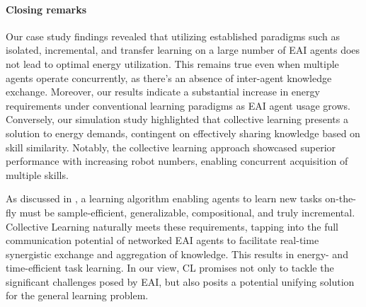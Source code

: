 \documentclass[12pt]{article}
\begin{document}
\paragraph*{Closing remarks}
Our case study findings revealed that utilizing established paradigms such as isolated, incremental, and transfer learning on a large number of EAI agents does not lead to optimal energy utilization. This remains true even when multiple agents operate concurrently, as there's an absence of inter-agent knowledge exchange. Moreover, our results indicate a substantial increase in energy requirements under conventional learning paradigms as EAI agent usage grows. Conversely, our simulation study highlighted that collective learning presents a solution to energy demands, contingent on effectively sharing knowledge based on skill similarity. Notably, the collective learning approach showcased superior performance with increasing robot numbers, enabling concurrent acquisition of multiple skills.

As discussed in \cite{Kaelbling2020foundationefficientrobot}, a learning algorithm enabling agents to learn new tasks on-the-fly must be sample-efficient, generalizable, compositional, and truly incremental. Collective Learning naturally meets these requirements, tapping into the full communication potential of networked EAI agents to facilitate real-time synergistic exchange and aggregation of knowledge. This results in energy- and time-efficient task learning. In our view, CL promises not only to tackle the significant challenges posed by EAI, but also posits a potential unifying solution for the general learning problem.
\end{document}
